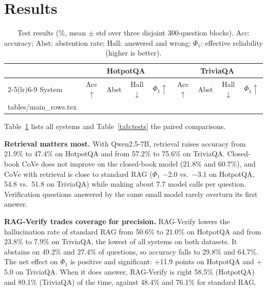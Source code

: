 \documentclass[conference]{IEEEtran}
\begin{document}
\section{Results}
\begin{table}[t]
\centering
\caption{Test results (\%, mean $\pm$ std over three disjoint 300-question blocks). Acc: accuracy; Abst: abstention rate; Hall: answered and wrong; $\Phi_1$: effective reliability (higher is better).}
\label{tab:main}
\setlength{\tabcolsep}{4pt}
\begin{tabular}{lcccccccc}
\toprule
 & \multicolumn{4}{c}{HotpotQA} & \multicolumn{4}{c}{TriviaQA} \\
\cmidrule(lr){2-5}\cmidrule(lr){6-9}
System & Acc$\uparrow$ & Abst & Hall$\downarrow$ & $\Phi_1\uparrow$ & Acc$\uparrow$ & Abst & Hall$\downarrow$ & $\Phi_1\uparrow$ \\
\midrule
{} tables/main_rows.tex 
\bottomrule
\end{tabular}
\end{table}

\begin{table}[t]
\centering
\caption{Paired bootstrap differences in $\Phi_1$ (percentage points, 95\% CI, 900 questions per dataset). $^{*}$: CI excludes zero.}
\label{tab:tests}
\setlength{\tabcolsep}{2pt}
\end{table}

Table~\ref{tab:main} lists all systems and Table~\ref{tab:tests} the paired comparisons.

\textbf{Retrieval matters most.} With Qwen2.5-7B, retrieval raises accuracy from 21.9\% to 47.4\% on HotpotQA and from 57.2\% to 75.6\% on TriviaQA. Closed-book CoVe does not improve on the closed-book model (21.8\% and 60.7\%), and CoVe with retrieval is close to standard RAG ($\Phi_1$ $-$2.0 vs.\ $-$3.1 on HotpotQA, 54.8 vs.\ 51.8 on TriviaQA) while making about 7.7 model calls per question. Verification questions answered by the same small model rarely overturn its first answer.

\textbf{RAG-Verify trades coverage for precision.} RAG-Verify lowers the hallucination rate of standard RAG from 50.6\% to 21.0\% on HotpotQA and from 23.8\% to 7.9\% on TriviaQA, the lowest of all systems on both datasets. It abstains on 49.2\% and 27.4\% of questions, so accuracy falls to 29.8\% and 64.7\%. The net effect on $\Phi_1$ is positive and significant: $+$11.9 points on HotpotQA and $+$5.0 on TriviaQA. When it does answer, RAG-Verify is right 58.5\% (HotpotQA) and 89.1\% (TriviaQA) of the time, against 48.4\% and 76.1\% for standard RAG.
\end{document}
